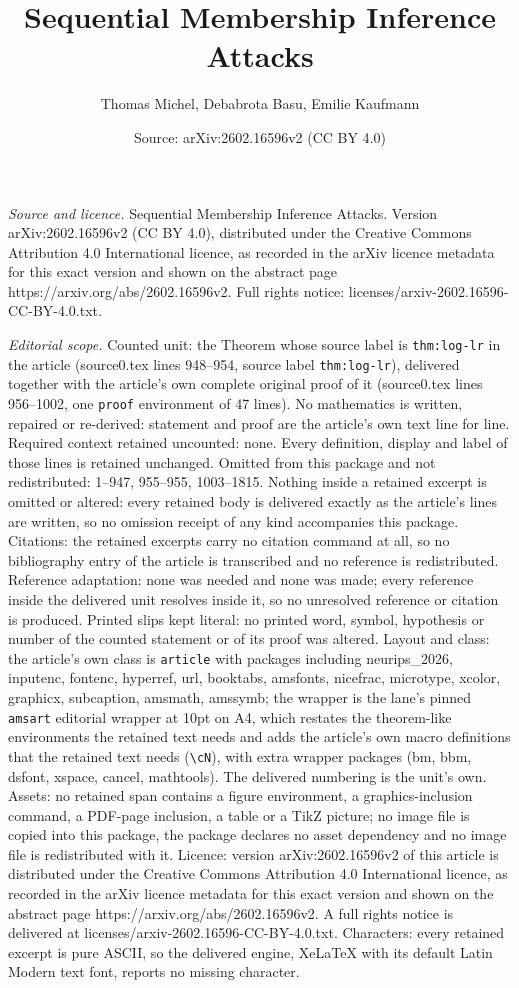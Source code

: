\documentclass[10pt,a4paper]{amsart}
\title[Sequential Membership Inference Attacks]{Sequential Membership Inference Attacks}
\author{Thomas Michel, Debabrota Basu, Emilie Kaufmann}
\date{Source: arXiv:2602.16596v2 (CC BY 4.0)}
\begin{document}
\maketitle

\noindent\emph{Source and licence.} Sequential Membership Inference Attacks. Version arXiv:2602.16596v2 (CC BY 4.0), distributed under the Creative Commons Attribution 4.0 International licence, as recorded in the arXiv licence metadata for this exact version and shown on the abstract page https://arxiv.org/abs/2602.16596v2. Full rights notice: licenses/arxiv-2602.16596-CC-BY-4.0.txt.\par\smallskip

\noindent\textit{Editorial scope.} Counted unit: the Theorem whose source label is \texttt{thm:log-lr} in the article (source0.tex lines 948--954, source label \texttt{thm:log-lr}), delivered together with the article's own complete original proof of it (source0.tex lines 956--1002, one \texttt{proof} environment of 47 lines). No mathematics is written, repaired or re-derived: statement and proof are the article's own text line for line. Required context retained uncounted: none. Every definition, display and label of those lines is retained unchanged. Omitted from this package and not redistributed: 1--947, 955--955, 1003--1815. Nothing inside a retained excerpt is omitted or altered: every retained body is delivered exactly as the article's lines are written, so no omission receipt of any kind accompanies this package. Citations: the retained excerpts carry no citation command at all, so no bibliography entry of the article is transcribed and no reference is redistributed. Reference adaptation: none was needed and none was made; every reference inside the delivered unit resolves inside it, so no unresolved reference or citation is produced. Printed slips kept literal: no printed word, symbol, hypothesis or number of the counted statement or of its proof was altered. Layout and class: the article's own class is \texttt{article} with packages including neurips\_2026, inputenc, fontenc, hyperref, url, booktabs, amsfonts, nicefrac, microtype, xcolor, graphicx, subcaption, amsmath, amssymb; the wrapper is the lane's pinned \texttt{amsart} editorial wrapper at 10pt on A4, which restates the theorem-like environments the retained text needs and adds the article's own macro definitions that the retained text needs (\texttt{\textbackslash cN}), with extra wrapper packages (bm, bbm, dsfont, xspace, cancel, mathtools). The delivered numbering is the unit's own. Assets: no retained span contains a figure environment, a graphics-inclusion command, a PDF-page inclusion, a table or a TikZ picture; no image file is copied into this package, the package declares no asset dependency and no image file is redistributed with it. Licence: version arXiv:2602.16596v2 of this article is distributed under the Creative Commons Attribution 4.0 International licence, as recorded in the arXiv licence metadata for this exact version and shown on the abstract page https://arxiv.org/abs/2602.16596v2. A full rights notice is delivered at licenses/arxiv-2602.16596-CC-BY-4.0.txt. Characters: every retained excerpt is pure ASCII, so the delivered engine, XeLaTeX with its default Latin Modern text font, reports no missing character.
\end{document}
